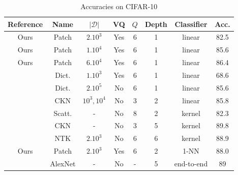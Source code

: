 \documentclass{article}
\begin{document}
{\begin{table}[h]
  \caption{Accuracies on CIFAR-10}
  \label{accuracy}
  \centering
  \begin{tabular}{|c|c|c|c|c|c|c|c|}
    \hline 
    Reference&Name&$|\mathcal{D}|$&VQ&$Q$&Depth &Classifier& Acc. \\
    \hline 
    \hline 
    Ours&Patch&$2.10^3$ & Yes&6&1&linear&82.5 \\
    \hdashline[0.5pt/1pt]
    Ours&Patch&$1.10^4$ & Yes&6&1&linear&85.6\\
    \hdashline[0.5pt/1pt]
    Ours&Patch&$6.10^4$ & Yes&6&1&linear&86.4\\
    \hdashline[0.5pt/1pt]
    \cite{coates2011analysis}&Dict.&$1.10^3$& Yes&6 & 1&linear & 68.6\\
    \hline 
    \cite{recht2019imagenet}&Dict.&$2.10^5$ & No& 6&1&linear &85.6\\
    \hdashline[0.5pt/1pt]
    \cite{mairal2016end}&CKN&$10^3, 10^4$& No&3 & 2& linear &85.8\\
    \hline
     \cite{Oyallon_2015_CVPR}&Scatt.& - & No& 8 &2 & kernel & 82.3\\
    \hdashline[0.5pt/1pt]
    \cite{shankar2020neural}&CKN&-& No&3&5&kernel &89.8\\
    \hdashline[0.5pt/1pt]
    \cite{li2019enhanced}&NTK&$2.10^3$& No&6&6&kernel &88.9\\
    \hline
    Ours&Patch&$2.10^3$ & Yes& 6&2&1-NN&88.0\\
    \hdashline[0.5pt/1pt]
    \cite{krizhevsky2012imagenet}&AlexNet&-& No&-&5&end-to-end&89\\
    \hline
  \end{tabular}
\end{table}




}
\end{document}
